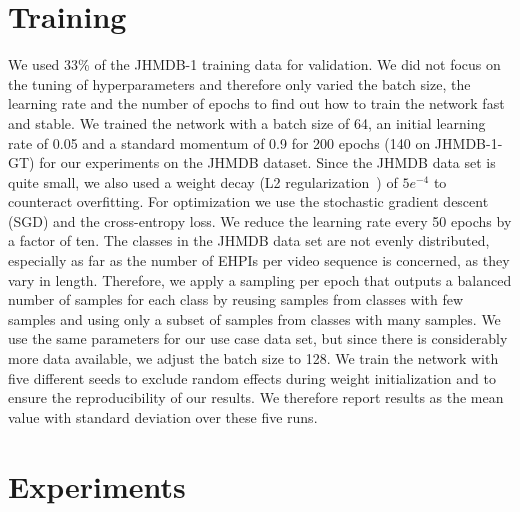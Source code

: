 \documentclass[a4paper, 10pt, conference]{ieeeconf}
\begin{document}
\section{Training}
We used 33\% of the JHMDB-1 training data for validation. We did not focus on the tuning of hyperparameters and therefore only varied the batch size, the learning rate and the number of epochs to find out how to train the network fast and stable. We trained the network with a batch size of 64, an initial learning rate of 0.05 and a standard momentum of 0.9 for 200 epochs (140 on JHMDB-1-GT) for our experiments on the JHMDB dataset. Since the JHMDB data set is quite small, we also used a weight decay (L2 regularization~\cite{ngFeatureSelectionL12004}) of $5e^{-4}$ to counteract overfitting. For optimization we use the stochastic gradient descent (SGD) and the cross-entropy loss. We reduce the learning rate every 50 epochs by a factor of ten. The classes in the JHMDB data set are not evenly distributed, especially as far as the number of EHPIs per video sequence is concerned, as they vary in length. Therefore, we apply a sampling per epoch that outputs a balanced number of samples for each class by reusing samples from classes with few samples and using only a subset of samples from classes with many samples. We use the same parameters for our use case data set, but since there is considerably more data available, we adjust the batch size to 128. We train the network with five different seeds to exclude random effects during weight initialization and to ensure the reproducibility of our results. We therefore report results as the mean value with standard deviation over these five runs.











\section{Experiments}
\end{document}
